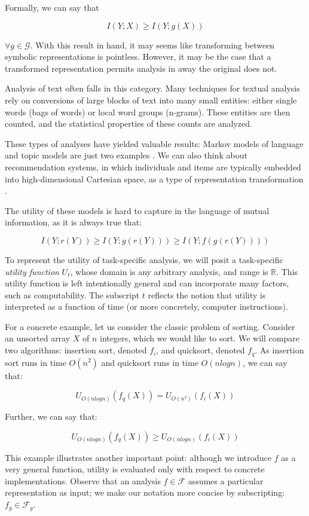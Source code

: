 Formally, we can say that

\[
I(Y; X) \geq I(Y; g(X))
\]

$\forall g \in \mathcal{G}$. With this result in hand, it may seems like transforming between symbolic representations is pointless.
However, it may be the case that a transformed representation permits analysis in away the original does not.

Analysis of text often falls in this category.
Many techniques for textual analysis rely on conversions of large blocks of text into many small entities: either single words (bags of words) or local word groups (n-grams).
These entities are then counted, and the statistical properties of these counts are analyzed.

These types of analyses have yielded valuable results: Markov models of language and topic models are just two examples \citep{blei}.
We can also think about recommendation systems, in which individuals and items are typically embedded into high-dimensional Cartesian space, as a type of representation transformation \citep{koren}.

The utility of these models is hard to capture in the language of mutual information, as it is always true that:

\[
I(Y; r(Y)) \geq I(Y; g(r(Y))) \geq I(Y; f(g(r(Y))))
\]

To represent the utility of task-specific analysis, we will posit a task-specific \textit{utility function} $U_t$, whose domain is any arbitrary analysis, and range is $\mathbb{R}$.
This utility function is left intentionally general and can incorporate many factors, such as computability.
The subscript $t$ reflects the notion that utility is interpreted as a function of time (or more concretely, computer instructions).

\bigskip

For a concrete example, let us consider the classic problem of sorting.
Consider an unsorted array $X$ of $n$ integers, which we would like to sort.
We will compare two algorithms: insertion sort, denoted $f_i$, and quicksort, denoted $f_q$.
As insertion sort runs in time $O(n^2)$ and quicksort runs in time $O(nlogn)$, we can say that:

\[
U_{O(nlogn)}(f_q(X)) = U_{O(n^2)}(f_i(X))
\]

Further, we can say that:

\[
U_{O(nlogn)}(f_q(X)) \geq U_{O(nlogn)}(f_i(X))
\]

This example illustrates another important point: although we introduce $f$ as a very general function, utility is evaluated only with respect to concrete implementations.
Observe that an analysis $f \in \mathcal{F}$ assumes a particular representation as input; we make our notation more concise by subscripting: $f_g \in \mathcal{F}_g$.

